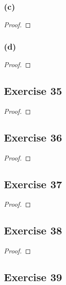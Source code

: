 \documentclass[14pt]{extarticle}
\begin{document}
\subsubsection{(c)}

\begin{proof}

\end{proof}

\subsubsection{(d)}

\begin{proof}

\end{proof}

\subsection{Exercise 35}

\begin{proof}

\end{proof}

\subsection{Exercise 36}

\begin{proof}

\end{proof}

\subsection{Exercise 37}

\begin{proof}

\end{proof}

\subsection{Exercise 38}

\begin{proof}

\end{proof}

\subsection{Exercise 39}
\end{document}
